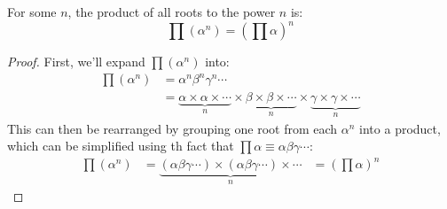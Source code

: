         \begin{theorem}
            For some $n$, the product of all \glspl{root} to the power $n$ is:
            \begin{equation}
                \prod\left(\alpha^n\right)=\left(\prod\alpha\right)^n
            \end{equation}
        \end{theorem}
        \begin{proof}
            First, we'll expand $\prod\left(\alpha^n\right)$ into:
            \begin{equation*}
                \begin{aligned}
                    \prod\left(\alpha^n\right)&=\alpha^n\beta^n\gamma^n\cdots \\
                    &=\underbrace{\alpha\times\alpha\times\cdots}_\text{$n$}\times\underbrace{\beta\times\beta\times\cdots}_\text{$n$}\times\underbrace{\gamma\times\gamma\times\cdots}_\text{$n$}
                \end{aligned}
            \end{equation*}
            This can then be rearranged by grouping one \gls{root} from each $\alpha^n$ into a product, which can be simplified using th fact that $\prod\alpha\equiv\alpha\beta\gamma\cdots$:
            \begin{equation*}
                \begin{aligned}
                    \prod\left(\alpha^n\right)&=\underbrace{(\alpha\beta\gamma\cdots)\times(\alpha\beta\gamma\cdots)\times\cdots}_\text{$n$}
                    &=\left(\prod\alpha\right)^n
                \end{aligned}
            \end{equation*}
        \end{proof}


